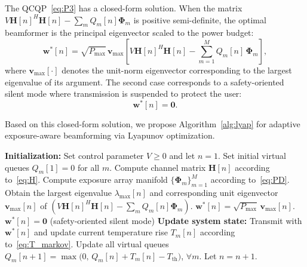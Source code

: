 \documentclass[journal]{IEEEtran}
\begin{document}
The QCQP~\eqref{eq:P3} has a closed-form solution. When the matrix $V\mathbf{H}[n]^H\mathbf{H}[n] - \sum_m Q_m[n]\boldsymbol{\Phi}_m$ is positive semi-definite, the optimal beamformer is the principal eigenvector scaled to the power budget:
\begin{equation}
    \mathbf{w}^*[n] = \sqrt{P_{\max}}\,\mathbf{v}_{\max}\!\left[V\mathbf{H}[n]^H\mathbf{H}[n] - \sum_{m=1}^{M} Q_m[n]\,\boldsymbol{\Phi}_m\right],
    \label{eq:w_opt}
\end{equation}
where $\mathbf{v}_{\max}[\cdot]$ denotes the unit-norm eigenvector corresponding to the largest eigenvalue of its argument. The second case corresponds to a safety-oriented silent mode where transmission is suspended to protect the user:
\begin{equation}
    \mathbf{w}^*[n] = \mathbf{0}.
\end{equation}

Based on this closed-form solution, we propose Algorithm~\ref{alg:lyap} for adaptive exposure-aware beamforming via Lyapunov optimization.

\begin{algorithm}[t]
\caption{Adaptive Exposure-Aware Beamforming via Lyapunov Optimization}
\label{alg:lyap}
\begin{algorithmic}[1]
    \STATE \textbf{Initialization:}
    \STATE Set control parameter $V \geq 0$ and let $n = 1$.
    \STATE Set initial virtual queues $Q_m[1] = 0$ for all $m$.
        \STATE Compute channel matrix $\mathbf{H}[n]$ according to~\eqref{eq:H}.
        \STATE Compute exposure array manifold $\{\boldsymbol{\Phi}_m\}_{m=1}^M$ according to~\eqref{eq:PD}.
        \STATE Obtain the largest eigenvalue $\lambda_{\max}[n]$ and corresponding unit eigenvector $\mathbf{v}_{\max}[n]$ of $\left(V\mathbf{H}[n]^H\mathbf{H}[n] - \sum_{m}Q_m[n]\boldsymbol{\Phi}_m\right)$.
            \STATE $\mathbf{w}^*[n] = \sqrt{P_{\max}}\,\mathbf{v}_{\max}[n]$.
        \ELSE
            \STATE $\mathbf{w}^*[n] = \mathbf{0}$ \hfill (safety-oriented silent mode)
        \ENDIF
        \STATE \textbf{Update system state:}
        \STATE Transmit with $\mathbf{w}^*[n]$ and update current temperature rise $T_m[n]$ according to~\eqref{eq:T_markov}.
        \STATE Update all virtual queues $Q_m[n+1] = \max\!\bigl(0,\, Q_m[n] + T_m[n] - T_{\text{th}}\bigr)$, $\forall m$.
        \STATE Let $n = n + 1$.
    \ENDWHILE
\end{algorithmic}
\end{algorithm}
\end{document}
